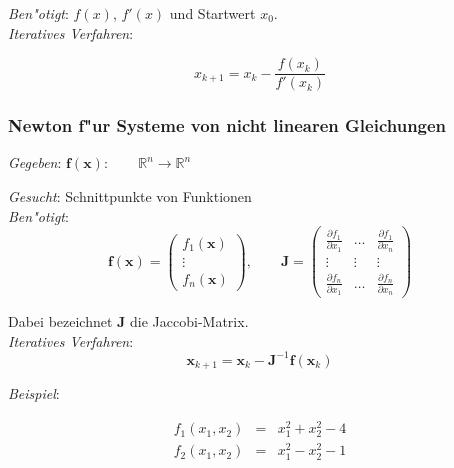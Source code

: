 \documentclass[german, 10pt, a4paper, twocolumn]{scrartcl}
\begin{document}
\textit{Ben"otigt}: $f(x)$, $f'(x)$ und Startwert $x_0$.\\

\textit{Iteratives Verfahren}:

\begin{displaymath}
	x_{k+1} = x_k - \frac{f(x_k)}{f'(x_k)}
\end{displaymath}

\subsubsection{Newton f"ur Systeme von nicht linearen Gleichungen}


\textit{Gegeben}: $\mathbf{f}(\mathbf{x}):\qquad \mathbb{R}^n \to \mathbb{R}^n$

\textit{Gesucht}: Schnittpunkte von Funktionen\\

\textit{Ben"otigt}:
\begin{displaymath}
	\mathbf{f}(\mathbf{x})=\left (
		\begin{array}{c}
			f_1(\mathbf{x})\\
			\vdots\\
			f_n(\mathbf{x})
		\end{array}
	\right ),\qquad
	\mathbf{J}= \left (
		\begin{array}{ccc}
			\frac{\partial f_1}{\partial x_1} & 	\ldots &		\frac{\partial f_1}{\partial x_n} \\
			\vdots &				\vdots &		\vdots \\
			\frac{\partial f_n}{\partial x_1} &	\ldots &		\frac{\partial f_n}{\partial x_n}
		\end{array}
	\right )
\end{displaymath}

Dabei bezeichnet $\mathbf{J}$ die Jaccobi-Matrix.\\

\textit{Iteratives Verfahren}:\\
\begin{displaymath}
	\mathbf{x}_{k+1} = \mathbf{x}_k - \mathbf{J}^{-1}\mathbf{f}(\mathbf{x}_k)
\end{displaymath}

\textit{Beispiel}:

\begin{eqnarray}
	f_1(x_1,x_2) &		= &	x_1^2+x_2^2 -4 \nonumber \\
	f_2(x_1,x_2) &		= &	x_1^2-x_2^2-1
\end{eqnarray}
\end{document}
